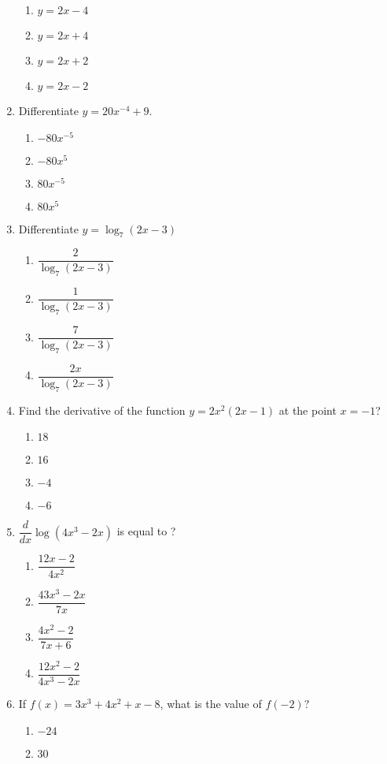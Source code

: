 \begin{multicols}{2}
\begin{enumerate}[label={\arabic*.}]
\begin{enumerate}[label={\Alph*.}]
	\item \(y = 2x - 4\)
	\item \(y = 2x + 4\)
	\item \(y = 2x + 2\)
	\item \(y = 2x - 2\)
	\end{enumerate}
\item Differentiate \(y = 20{x}^{-4} + 9\).
	\begin{enumerate}[label={\Alph*.}]
	\item \(-80{x}^{-5}\)
	\item \(-80{x}^{5}\)
	\item \(80{x}^{-5}\)
	\item \(80{x}^{5}\)
	\end{enumerate}
\item Differentiate \(y = \log_{7}{(2x - 3)}\)   
	\begin{enumerate}[label={\Alph*.}]
	\item \(\dfrac{2}{\log_{7}{(2x - 3)}}\)
	\item \(\dfrac{1}{\log_{7}{(2x - 3)}}\)
	\item \(\dfrac{7}{\log_{7}{(2x - 3)}}\)
	\item \(\dfrac{2x}{\log_{7}{(2x - 3)}}\)
	\end{enumerate}
\item Find the derivative of the function \(y = 2{x}^{2}(2x - 1)\) at the point \(x = -1\)?
	\begin{enumerate}[label={\Alph*.}]
	\item \(18\)
	\item \(16\)
	\item \(-4\)
	\item \(-6\)
	\end{enumerate}
\item \(\dfrac{d}{dx}\log{(4x^3 - 2x)}\) is equal to ?
	\begin{enumerate}[label={\Alph*.}]
	\item \(\dfrac{12x - 2}{4x^2}\)
	\item \(\dfrac{43x^3 - 2x}{7x}\)
	\item \(\dfrac{4x^2 - 2}{7x + 6}\)
	\item \(\dfrac{12x^2 - 2}{4x^3 - 2x}\)
	\end{enumerate}
\item If \(f(x) = 3x^3 + 4x^2 + x - 8\), what is the value of \(f(-2)?\)
	\begin{enumerate}[label={\Alph*.}]
	\item \(-24\)
	\item \(30\)

\end{enumerate}
\end{enumerate}
\end{multicols}
